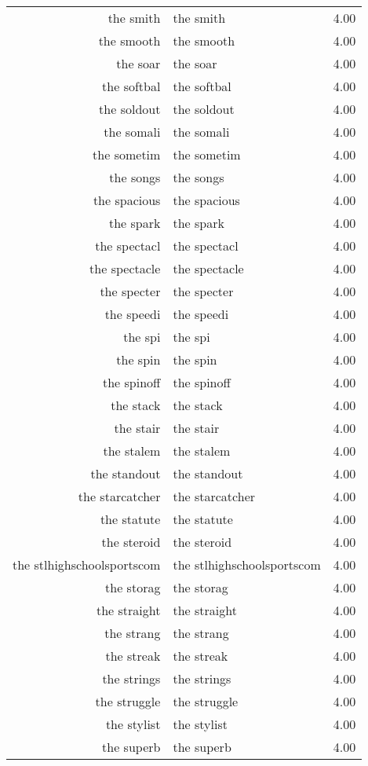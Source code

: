 \begin{table}[ht]
\begin{tabular}{rlr}
  the smith & the smith & 4.00 \\ 
  the smooth & the smooth & 4.00 \\ 
  the soar & the soar & 4.00 \\ 
  the softbal & the softbal & 4.00 \\ 
  the soldout & the soldout & 4.00 \\ 
  the somali & the somali & 4.00 \\ 
  the sometim & the sometim & 4.00 \\ 
  the songs & the songs & 4.00 \\ 
  the spacious & the spacious & 4.00 \\ 
  the spark & the spark & 4.00 \\ 
  the spectacl & the spectacl & 4.00 \\ 
  the spectacle & the spectacle & 4.00 \\ 
  the specter & the specter & 4.00 \\ 
  the speedi & the speedi & 4.00 \\ 
  the spi & the spi & 4.00 \\ 
  the spin & the spin & 4.00 \\ 
  the spinoff & the spinoff & 4.00 \\ 
  the stack & the stack & 4.00 \\ 
  the stair & the stair & 4.00 \\ 
  the stalem & the stalem & 4.00 \\ 
  the standout & the standout & 4.00 \\ 
  the starcatcher & the starcatcher & 4.00 \\ 
  the statute & the statute & 4.00 \\ 
  the steroid & the steroid & 4.00 \\ 
  the stlhighschoolsportscom & the stlhighschoolsportscom & 4.00 \\ 
  the storag & the storag & 4.00 \\ 
  the straight & the straight & 4.00 \\ 
  the strang & the strang & 4.00 \\ 
  the streak & the streak & 4.00 \\ 
  the strings & the strings & 4.00 \\ 
  the struggle & the struggle & 4.00 \\ 
  the stylist & the stylist & 4.00 \\ 
  the superb & the superb & 4.00 \\ 

\end{tabular}
\end{table}
